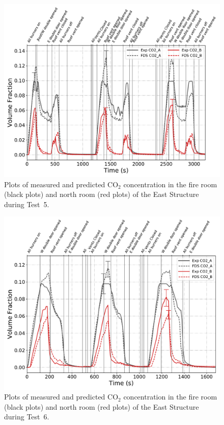 \begin{figure}[!h]
	\centering
	\includegraphics[width=\columnwidth]{Figures/Plots/Validation/Gas_Concentration/Test_5_CO2}
	\caption[Plots of measured and predicted CO$_2$ concentration during Test~5.]{Plots of measured and predicted CO$_2$ concentration in the fire room (black plots) and north room (red plots) of the East Structure during Test~5.}
	\label{fig:Test5_CO2}
\end{figure}

\begin{figure}[!h]
	\centering
	\includegraphics[width=\columnwidth]{Figures/Plots/Validation/Gas_Concentration/Test_6_CO2}
	\caption[Plots of measured and predicted CO$_2$ concentration during Test~6.]{Plots of measured and predicted CO$_2$ concentration in the fire room (black plots) and north room (red plots) of the East Structure during Test~6.}
	\label{fig:Test6_CO2}
\end{figure}

